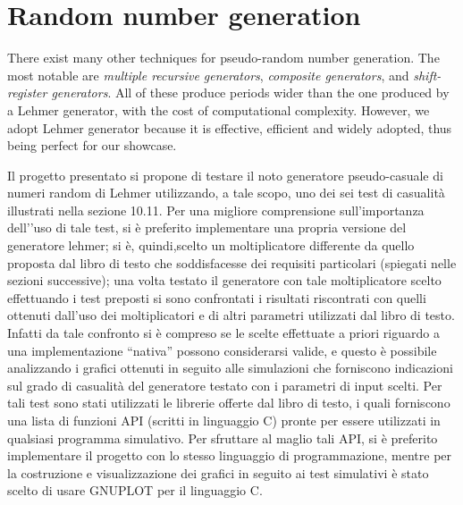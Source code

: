 \section{Random number generation}
\label{sec:random-number-generation}

There exist many other techniques for pseudo-random number generation.
The most notable are \textit{multiple recursive generators}, \textit{composite generators}, and \textit{shift-register generators}. All of these produce periods wider than the one produced by a Lehmer generator, with the cost of computational complexity.
However, we adopt Lehmer generator because it is effective, efficient and widely adopted, thus being perfect for our showcase.

Il progetto presentato si propone di testare il noto generatore pseudo-casuale di numeri random di Lehmer utilizzando, a tale scopo, uno dei sei test di casualità illustrati nella sezione 10.11.
Per una migliore comprensione sull’importanza dell’’uso di tale test, si è preferito implementare una propria versione del generatore lehmer; si è, quindi,scelto un moltiplicatore differente da quello proposta dal libro di testo che soddisfacesse dei requisiti particolari (spiegati nelle sezioni successive); una volta testato il generatore con tale moltiplicatore scelto effettuando i test preposti si sono confrontati i risultati riscontrati con quelli ottenuti dall’uso dei moltiplicatori e di altri parametri utilizzati dal libro di testo. Infatti da tale confronto si è compreso se le scelte effettuate a priori riguardo a una implementazione “nativa” possono considerarsi valide, e questo è possibile analizzando i grafici ottenuti in seguito alle simulazioni che forniscono indicazioni sul grado di casualità del generatore testato con i parametri di input scelti.
Per tali test sono stati utilizzati le librerie offerte dal libro di testo, i quali forniscono una lista di funzioni API (scritti in linguaggio C) pronte per essere utilizzati in qualsiasi programma simulativo.
Per sfruttare al maglio tali API, si è preferito implementare il progetto con lo stesso linguaggio di programmazione, mentre per la costruzione e visualizzazione dei grafici in seguito ai test simulativi è stato scelto di usare GNUPLOT per il linguaggio C.

\lipsum[1]

